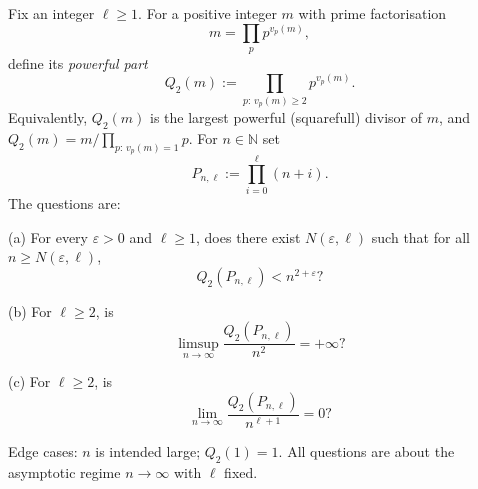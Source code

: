 Fix an integer \(\ell\ge 1\). For a positive integer \(m\) with prime factorisation
\[m=\prod_{p} p^{v_p(m)},\]
define its \emph{powerful part}
\[Q_2(m):=\prod_{p:\,v_p(m)\ge 2} p^{v_p(m)}.\]
Equivalently, \(Q_2(m)\) is the largest powerful (squarefull) divisor of \(m\), and
\(Q_2(m)=m/\prod_{p:\,v_p(m)=1}p\).
For \(n\in\mathbb N\) set
\[P_{n,\ell}:=\prod_{i=0}^{\ell} (n+i).\]
The questions are:

(a) For every \(\varepsilon>0\) and \(\ell\ge 1\), does there exist \(N(\varepsilon,\ell)\) such that for all \(n\ge N(\varepsilon,\ell)\),
\[Q_2(P_{n,\ell})<n^{2+\varepsilon}?\]

(b) For \(\ell\ge 2\), is
\[\limsup_{n\to\infty} \frac{Q_2(P_{n,\ell})}{n^2}=+\infty?\]

(c) For \(\ell\ge 2\), is
\[\lim_{n\to\infty} \frac{Q_2(P_{n,\ell})}{n^{\ell+1}}=0?\]

Edge cases: \(n\) is intended large; \(Q_2(1)=1\). All questions are about the asymptotic regime \(n\to\infty\) with \(\ell\) fixed.

